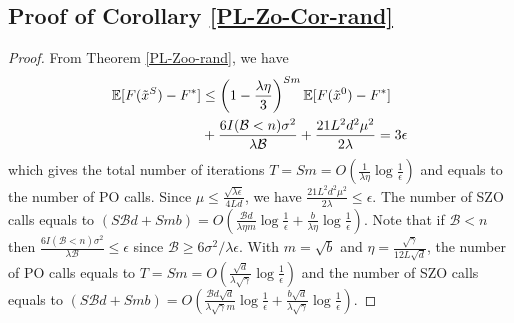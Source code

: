 \documentclass[iicol,sn-basic]{sn-jnl}
\theoremstyle{thmstyleone}%
\theoremstyle{thmstyletwo}%
\theoremstyle{thmstylethree}%
\newcommand*{\E}{\mathbb{E}}
\newtheorem{corollary}[theorem]{Corollary}
\begin{document}
\noindent\subsection{Proof of Corollary \ref{PL-Zo-Cor-rand}}
\begin{proof}
From Theorem \ref{PL-Zoo-rand}, we have
\begin{align}
\E[F(\tilde{x}^S) - {F}^*] & \leq   \left(1-\frac{\lambda\eta}{3}\right)^{Sm} \E[F(\tilde{x}^0) - {F}^*]\notag\\
& + \frac{6I(\mathcal{B} < n) \sigma ^2}{\lambda\mathcal{\mathcal{B}}}+\frac{21 L^2 d^2 \mu^2}{2\lambda}= 3 \epsilon
\end{align}
which gives the total number of iterations $T = Sm = O(\frac{1}{\lambda\eta}\log\frac{1}{\epsilon})$ and equals to the number of PO calls. Since $\mu \leq \frac{\sqrt{\lambda\epsilon}}{4 L d}$, we have $\frac{21 L^2 d^2 \mu^2}{2\lambda} \leq \epsilon$. The number of SZO calls equals to $(S\mathcal{B}d+Smb) = O(\frac{\mathcal{B}d}{\lambda\eta m}\log\frac{1}{\epsilon}+\frac{b}{\lambda\eta}\log\frac{1}{\epsilon})$.  Note that if $\mathcal{B} < n$ then $\frac{6I(\mathcal{B} < n) \sigma ^2}{\lambda\mathcal{B}} \leq \epsilon$ since $\mathcal{B} \geq 6 {\sigma ^2}/{\lambda \epsilon}$. With $m=\sqrt{b}$ and $\eta = \frac{\sqrt{\gamma}}{12 L\sqrt{d}}$, the number of PO calls equals to $T = Sm = O(\frac{\sqrt{d}}{\lambda\sqrt{\gamma}}\log\frac{1}{\epsilon})$ and the number of SZO calls equals to $(S\mathcal{B}d+Smb) = O(\frac{\mathcal{B}d\sqrt{d}}{\lambda\sqrt{\gamma} m}\log\frac{1}{\epsilon}+\frac{b\sqrt{d}}{\lambda\sqrt{\gamma}}\log\frac{1}{\epsilon})$.
\end{proof}
\end{document}
